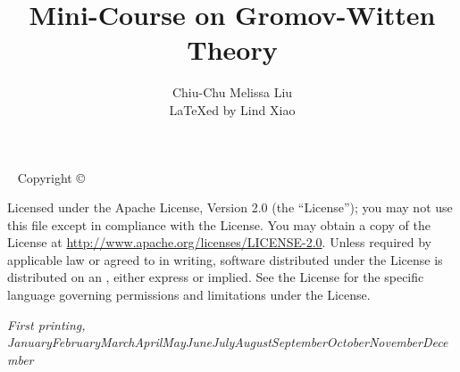 \documentclass{tufte-book} %
\title{Mini-Course on Gromov-Witten Theory} %
\author{Chiu-Chu Melissa Liu \\
LaTeXed by Lind Xiao} %
\newcommand{\monthyear}{\ifcase\month\or January\or February\or March\or April\or May\or June\or July\or August\or September\or October\or November\or December\fi\space\number\year} %
\newcommand{\openepigraph}[2]{ %
\begin{fullwidth}
\sffamily\large
\begin{doublespace}
\noindent\allcaps{#1}\\ %
\noindent\allcaps{#2} %
\end{doublespace}
\end{fullwidth}
}
\numberwithin{dummy}{section}
\begin{document}
\frontmatter




\maketitle %


\newpage
\begin{fullwidth}
~\vfill
\thispagestyle{empty}
\setlength{\parindent}{0pt}
\setlength{\parskip}{\baselineskip}
Copyright \copyright\ \the\year\ \thanklessauthor

\par{}

\par{}

\par Licensed under the Apache License, Version 2.0 (the ``License''); you may not use this file except in compliance with the License. You may obtain a copy of the License at \url{http://www.apache.org/licenses/LICENSE-2.0}. Unless required by applicable law or agreed to in writing, software distributed under the License is distributed on an , either express or implied. See the License for the specific language governing permissions and limitations under the License.

\par\textit{First printing, \monthyear}
\end{fullwidth}
\end{document}
